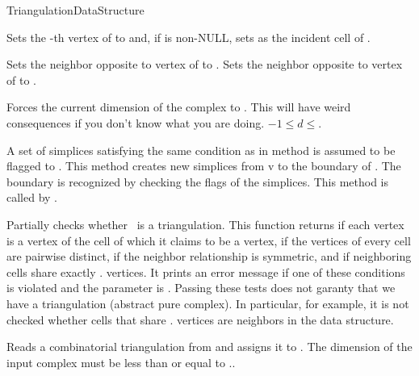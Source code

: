 \begin{ccRefConcept}{TriangulationDataStructure}
\begin{ccAdvanced}
{Sets the -th vertex of  to  and, if  is non-NULL,
sets  as the incident cell of .}

{Sets the neighbor opposite to vertex  of   to
. Sets the neighbor opposite to vertex  of 
 to .}

 { Forces the current dimension
of the complex to . This will have weird consequences if you don't know
what you are doing. 
\ccPrecond $-1\leq d\leq$.}

{A set  of simplices satisfying the same condition as in method
\ccRefName{} is assumed to be flagged to . This
method creates new simplices from  v to the boundary of .
The boundary is recognized by checking the flags of the simplices.
This method is called by \ccRefName{}.}

\end{ccAdvanced}


{Partially checks whether \ccVar\ is a triangulation. This function
returns  if each vertex is a vertex of the cell of which it
claims to be a vertex, if the vertices of every cell are pairwise distinct,
if the neighbor relationship is symmetric, and if neighboring cells share
exactly \ccVar. vertices. It prints an error message
if one of these conditions is violated and the  parameter is
. Passing these tests does not garanty that we have a
triangulation (abstract pure
complex). In particular, for example, it is not
checked whether cells that share \ccVar. vertices
are neighbors in the data structure.}


{Reads a combinatorial triangulation from  and assigns it to
. \ccPrecond The dimension of the input complex must be less than or
equal to \ccVar..}


\end{ccRefConcept}
